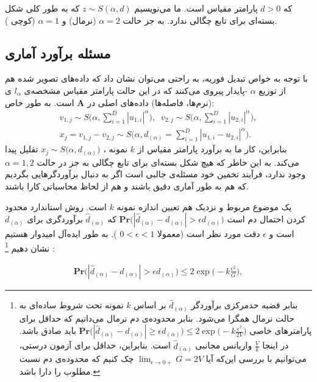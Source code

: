 که 
$d>0$
پارامتر مقیاس است. ما می‌نویسیم 
$z \sim S(\alpha, d)$
که به طور کلی شکل بسته‌ای برای تابع چگالی ندارد. به جز حالت 
$\alpha = 2$
(نرمال) و 
$\alpha = 1$
(کوچی%
).


\subsection{
مسئله برآورد آماری
}

با توجه به خواص تبدیل فوریه، به راحتی می‌توان نشان داد که داده‌های تصویر شده هم از توزیع 
$\alpha$
-پایدار پیروی می‌کنند که در این حالت پارامتر مقیاس مشخصه‌ی 
$l_\alpha$
ی (نرم‌ها، فاصله‌ها) داده‌های اصلی در 
$\mathbf{A}$
است. به طور خاص:
\begin{align}
v_{1,j} \sim S \bigg( \alpha, \sum_{i=1}^D |u_{1,i}|^\alpha \bigg), \;\;
v_{2,j} \sim S \bigg( \alpha, \sum_{i=1}^D |u_{2,i}|^\alpha \bigg),
 \label{eq:1hp}\\
x_j = v_{1,j} - v_{2,j} \sim S \bigg( \alpha, d_{(\alpha)} = 
\sum_{i=1}^D | u_{1,i} - u_{2,i} |^\alpha \bigg).
 \label{eq:1hq}
\end{align}
بنابراین، کار ما به برآورد پارامتر مقیاس از 
$k$
نمونه 
، 
$x_j \sim S \big( \alpha, d_{(\alpha)} \big)$
تقلیل پیدا می‌کند. به این خاطر که هیچ شکل بسته‌ای برای تابع چگالی به جز در حالت 
$\alpha = 1,2$
وجود ندارد، فرآیند تخمین خود مسئله‌ی جالبی است اگر به دنبال برآوردگرهایی بگردیم که هم به طور آماری دقیق باشند و هم از لحاظ محاسباتی کارا باشند.

یک موضوع مربوط و نزدیک هم تعیین اندازه نمونه
$k$
است. روش استاندارد محدود کردن احتمال دم است 
$\mathbf{Pr} \big( | \hat{d}_{(\alpha)} - d_{(\alpha)} | > \epsilon d_{(\alpha)} \big)$
که 
$\hat{d}_{(\alpha)}$
برآوردگری برای
$d_{(\alpha)}$
است و 
$\epsilon$
دقت مورد نظر است (معمولا 
$0<\epsilon<1$
). به طور ایده‌آل امیدوار هستیم نشان دهیم
\footnote{
بنابر قضیه حدمرکزی برآوردگر 
$\hat{d}_{(\alpha)}$
بر اساس
$k$
نمونه تحت شروط ساده‌ای به حالت نرمال همگرا می‌شود. بنابر محدوده‌ی دم نرمال می‌دانیم که حداقل برای پارامترهای خاصی 
$\mathbf{Pr} \big( | \hat{d}_{(\alpha)} - d_{(\alpha)} | \geq \epsilon d_{(\alpha)} \big) \leq 2 \exp \Big( -k \frac{\epsilon^2}{2V} \Big)$
باید صادق باشد. در اینجا 
$\frac{V}{k}$
واریانس مجانبی 
$\hat{d}_{(\alpha)}$
است. بنابراین، حداقل برای آزمون درستی، می‌توانیم با بررسی این‌که آیا
$\lim_{\epsilon \rightarrow 0+} G = 2V$
چک کنیم که محدوده‌ی دم نسبت مطلوب را دارا باشد.
}
:

\begin{align}
\mathbf{Pr} \big( | \hat{d}_{(\alpha)} - d_{(\alpha)}| > \epsilon d_{(\alpha)} \big) \leq 2 \exp \bigg( -k \frac{\epsilon^2}{G} \bigg),
\label{eq:1hr}
\end{align}

